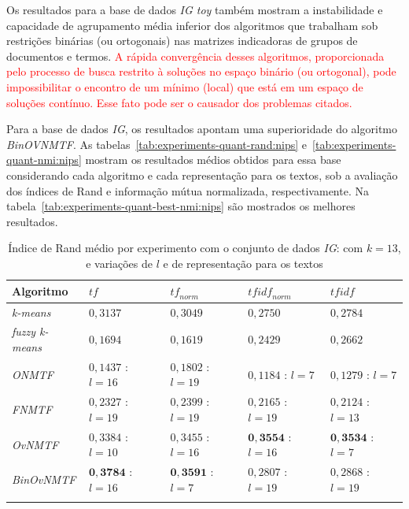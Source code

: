 \documentclass[
    12pt,                %
    oneside,            %
    a4paper,            %
    english,            %
    brazil                %
    ]{abntex2ppgsi}
\begin{document}
Os resultados para a base de dados \textit{IG toy} também mostram a instabilidade e capacidade de agrupamento média inferior dos algoritmos que trabalham sob restrições binárias (ou ortogonais) nas matrizes indicadoras de grupos de documentos e termos. \textcolor{red}{A rápida convergência desses algoritmos, proporcionada pelo processo de busca restrito à soluções no espaço binário (ou ortogonal), pode impossibilitar o encontro de um mínimo (local) que está em um espaço de soluções contínuo. Esse fato pode ser o causador dos problemas citados.}



Para a base de dados \textit{IG}, os resultados apontam uma superioridade do algoritmo \textit{BinOVNMTF}. As tabelas~\ref{tab:experiments-quant-rand:nips} e~\ref{tab:experiments-quant-nmi:nips} mostram os resultados médios obtidos para essa base considerando cada algoritmo e cada representação para os textos, sob a avaliação dos índices de Rand e informação mútua normalizada, respectivamente. Na tabela~\ref{tab:experiments-quant-best-nmi:nips} são mostrados os melhores resultados.

\begin{table}[H]
\centering
    \caption{Índice de Rand médio por experimento com o conjunto de dados \textit{IG}: com $k = 13$, e variações de $l$ e de representação para os textos}
    \begin{tabular}{lllll}
        \hline
        \textbf{Algoritmo} & $\textit{tf}$ & $\textit{tf}_{norm}$ & $\textit{tfidf}_{norm}$ & $\textit{tfidf}$ \\
        \hline
        \textit{k-means}       & $0,3137$            & $0,3049$            & $0,2750$            & $0,2784$ \\
        \textit{fuzzy k-means} & $0,1694$            & $0,1619$            & $0,2429$            & $0,2662$ \\
        \textit{ONMTF}         & $0,1437$ : $l = 16$ & $0,1802$ : $l = 19$ & $0,1184$ : $l = 7$  & $0,1279$ : $l = 7$ \\
        \textit{FNMTF}         & $0,2327$ : $l = 19$ & $0,2399$ : $l = 19$ & $0,2165$ : $l = 19$ & $0,2124$ : $l = 13$ \\
        \textit{OvNMTF}        & $0,3384$ : $l = 10$ & $0,3455$ : $l = 16$ & $\mathbf{0,3554}$ : $l = 16$ & $\mathbf{0,3534}$ : $l = 7$ \\
        \textit{BinOvNMTF}     & $\mathbf{0,3784}$ : $l = 16$ & $\mathbf{0,3591}$ : $l = 7$ & $0,2807$ : $l = 19$ & $0,2868$ : $l = 19$ \\
        \hline \\
    \end{tabular}
    \label{tab:experiments-quant-rand:ig}
\end{table}
\end{document}
